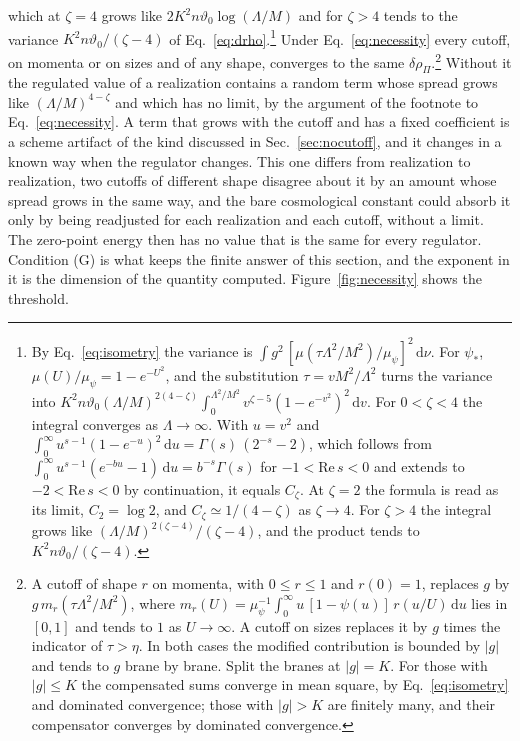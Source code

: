 \documentclass[aps,prd,10pt,twocolumn,superscriptaddress,nofootinbib,floatfix,longbibliography]{revtex4-2}
\newcommand{\dd}{\mathrm{d}}
\begin{document}
which at $\zeta=4$ grows like $2K^2n\vartheta_0\log(\Lambda/M)$ and for $\zeta>4$ tends to the variance $K^2n\vartheta_0/(\zeta-4)$ of Eq.~\eqref{eq:drho}.\footnote{By Eq.~\eqref{eq:isometry} the variance is $\int g^2\,[\mu(\tau\Lambda^2/M^2)/\mu_\psi]^2\,\dd\nu$. For $\psi_*$, $\mu(U)/\mu_\psi=1-e^{-U^2}$, and the substitution $\tau=vM^2/\Lambda^2$ turns the variance into $K^2n\vartheta_0(\Lambda/M)^{2(4-\zeta)}\int_0^{\Lambda^2/M^2}v^{\zeta-5}(1-e^{-v^2})^2\,\dd v$. For $0<\zeta<4$ the integral converges as $\Lambda\to\infty$. With $u=v^2$ and $\int_0^\infty u^{s-1}(1-e^{-u})^2\,\dd u=\Gamma(s)\,(2^{-s}-2)$, which follows from $\int_0^\infty u^{s-1}(e^{-bu}-1)\,\dd u=b^{-s}\Gamma(s)$ for $-1<\mathrm{Re}\,s<0$ and extends to $-2<\mathrm{Re}\,s<0$ by continuation, it equals $C_\zeta$. At $\zeta=2$ the formula is read as its limit, $C_2=\log2$, and $C_\zeta\simeq1/(4-\zeta)$ as $\zeta\to4$. For $\zeta>4$ the integral grows like $(\Lambda/M)^{2(\zeta-4)}/(\zeta-4)$, and the product tends to $K^2n\vartheta_0/(\zeta-4)$.} Under Eq.~\eqref{eq:necessity} every cutoff, on momenta or on sizes and of any shape, converges to the same $\delta\rho_\Pi$.\footnote{A cutoff of shape $r$ on momenta, with $0\le r\le1$ and $r(0)=1$, replaces $g$ by $g\,m_r(\tau\Lambda^2/M^2)$, where $m_r(U)=\mu_\psi^{-1}\int_0^\infty u\,[1-\psi(u)]\,r(u/U)\,\dd u$ lies in $[0,1]$ and tends to $1$ as $U\to\infty$. A cutoff on sizes replaces it by $g$ times the indicator of $\tau>\eta$. In both cases the modified contribution is bounded by $|g|$ and tends to $g$ brane by brane. Split the branes at $|g|=K$. For those with $|g|\le K$ the compensated sums converge in mean square, by Eq.~\eqref{eq:isometry} and dominated convergence; those with $|g|>K$ are finitely many, and their compensator converges by dominated convergence.} Without it the regulated value of a realization contains a random term whose spread grows like $(\Lambda/M)^{4-\zeta}$ and which has no limit, by the argument of the footnote to Eq.~\eqref{eq:necessity}. A term that grows with the cutoff and has a fixed coefficient is a scheme artifact of the kind discussed in Sec.~\ref{sec:nocutoff}, and it changes in a known way when the regulator changes. This one differs from realization to realization, two cutoffs of different shape disagree about it by an amount whose spread grows in the same way, and the bare cosmological constant could absorb it only by being readjusted for each realization and each cutoff, without a limit. The zero-point energy then has no value that is the same for every regulator. Condition (G) is what keeps the finite answer of this section, and the exponent in it is the dimension of the quantity computed. Figure~\ref{fig:necessity} shows the threshold.
\end{document}
